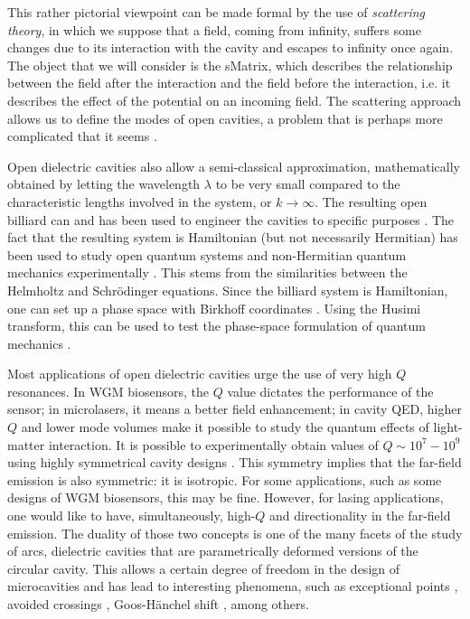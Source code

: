 This rather pictorial viewpoint can be made formal by the use of \textit{scattering theory}, 
in which we suppose that a field, coming from infinity, suffers some changes due to its
interaction with the cavity and escapes to infinity once again. The object that we will consider
is the \gls{sMatrix}, which describes the relationship between the field after the interaction
and the field before the interaction, i.e. it describes the effect of the potential
on an incoming field. The scattering approach allows us to define the modes of 
open cavities, a problem that is perhaps more complicated that it seems \cite{DUT2000,DUT2001,TUR2005}.

Open dielectric cavities also allow a semi-classical approximation, mathematically
obtained by letting the wavelength $\lambda$ to be very small compared to 
the characteristic lengths involved in the system, or $k\rightarrow\infty$. 
The resulting open billiard can and has been used to engineer the cavities
to specific purposes \cite{KIM2013}. The fact
that the resulting system is Hamiltonian (but not necessarily Hermitian) 
has been used to study open quantum systems and non-Hermitian quantum 
mechanics experimentally \cite{BIT2010}. This stems from the similarities between the
Helmholtz and Schrödinger equations. Since the billiard system is Hamiltonian, 
one can set up a phase space with Birkhoff coordinates \cite{BIR1927}. 
Using the Husimi \cite{LEE1995} transform, this can be used to test
the phase-space formulation of quantum mechanics \cite{ZUR2003}.

Most applications of open dielectric cavities urge the use of very high $Q$
resonances. In WGM biosensors, the $Q$ value dictates the performance
of the sensor; in microlasers, it means a better field enhancement; in cavity
QED, higher $Q$ and lower mode volumes make it possible to study the quantum 
effects of light-matter interaction. It is possible to experimentally obtain
values of $Q\sim10^7-10^9$ using highly symmetrical cavity designs \cite{ARM2003,ARM2007,WAR2011}.
This symmetry implies that the far-field emission is also symmetric: it is
isotropic. For some applications, such as some designs of WGM biosensors, this may be
fine. However, for lasing applications, one would like to have, simultaneously, 
high-$Q$ and directionality in the far-field emission. The duality of those 
two concepts is one of the many facets of the study of \glspl{arc}, dielectric
cavities that are parametrically deformed versions of the circular cavity. 
This allows a certain degree of freedom in the design of microcavities and has
lead to interesting phenomena, such as exceptional points \cite{DET2009,RYU2009,HEI2012,BIT2014}, 
avoided crossings \cite{SON2013}, Goos-Hänchel shift \cite{UNT2008}, among others.


